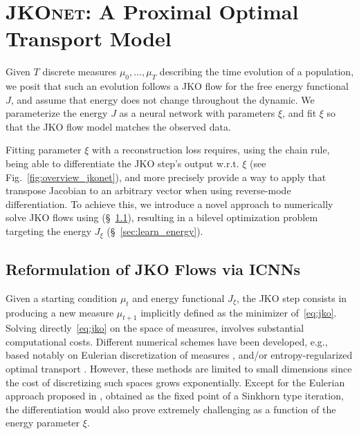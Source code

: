 \section{\textsc{JKOnet}: A Proximal Optimal Transport Model} 

Given $T$ discrete measures $\mu_0, \dots, \mu_T$ describing the time evolution of a population, we posit that such an evolution follows a \acrshort{JKO} flow for the free energy functional $J$, and assume that energy does not change throughout the dynamic. We parameterize the energy $J$ as a neural network with parameters $\xi$, and fit $\xi$ so that the \acrshort{JKO} flow model matches the observed data. 

Fitting parameter $\xi$ with a reconstruction loss requires, using the chain rule, being able to differentiate the \acrshort{JKO} step's output w.r.t. $\xi$ (see Fig.~\ref{fig:overview_jkonet}), and more precisely provide a way to apply that transpose Jacobian to an arbitrary vector when using reverse-mode differentiation. To achieve this, we introduce a novel approach to numerically solve \acrshort{JKO} flows using  (\S~\ref{sec:jko_icnn}), resulting in a bilevel optimization problem targeting the energy $J_\xi$ (\S~\ref{sec:learn_energy}).

\subsection{Reformulation of JKO Flows via ICNNs} \label{sec:jko_icnn}
Given a starting condition $\mu_t$ and energy functional $J_\xi$, the \acrshort{JKO} step consists in producing a new measure $\mu_{t+1}$ implicitly defined as the minimizer of~\eqref{eq:jko}. Solving directly~\eqref{eq:jko} on the space of measures, involves substantial computational costs. Different numerical schemes have been developed, e.g., based notably on Eulerian discretization of measures \citep{carrillo2021primal, benamou2016discretization}, and/or entropy-regularized optimal transport \citep{peyre2015entropic}. However, these methods are limited to small dimensions since the cost of discretizing such spaces grows exponentially. Except for the Eulerian approach proposed in \citep{peyre2015entropic}, obtained as the fixed point of a Sinkhorn type iteration, the differentiation would also prove extremely challenging as a function of the energy parameter $\xi$.


